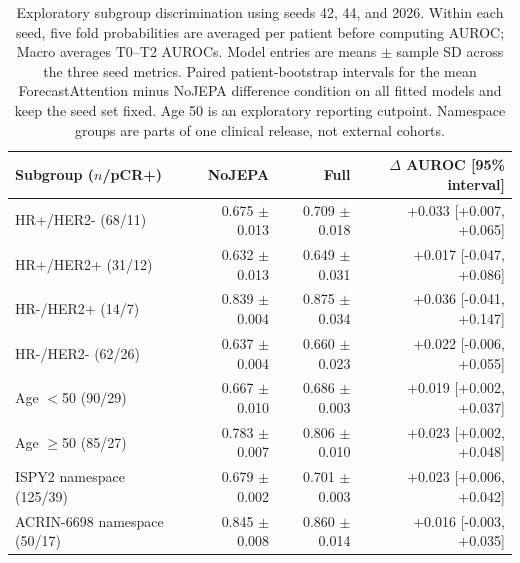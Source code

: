 \begin{table}[t]
\centering
\small
\caption{Exploratory subgroup discrimination using seeds 42, 44, and 2026. Within each seed, five fold probabilities are averaged per patient before computing AUROC; Macro averages T0--T2 AUROCs. Model entries are means $\pm$ sample SD across the three seed metrics. Paired patient-bootstrap intervals for the mean ForecastAttention minus NoJEPA difference condition on all fitted models and keep the seed set fixed. Age 50 is an exploratory reporting cutpoint. Namespace groups are parts of one clinical release, not external cohorts.}
\label{tab:subgroups}
\begin{tabular}{lrrr}
\toprule
Subgroup ($n$/pCR+) & NoJEPA & Full & $\Delta$ AUROC [95\% interval] \\
\midrule
HR+/HER2- (68/11) & 0.675 $\pm$ 0.013 & 0.709 $\pm$ 0.018 & +0.033 [+0.007, +0.065] \\
HR+/HER2+ (31/12) & 0.632 $\pm$ 0.013 & 0.649 $\pm$ 0.031 & +0.017 [-0.047, +0.086] \\
HR-/HER2+ (14/7) & 0.839 $\pm$ 0.004 & 0.875 $\pm$ 0.034 & +0.036 [-0.041, +0.147] \\
HR-/HER2- (62/26) & 0.637 $\pm$ 0.004 & 0.660 $\pm$ 0.023 & +0.022 [-0.006, +0.055] \\
Age $<$50 (90/29) & 0.667 $\pm$ 0.010 & 0.686 $\pm$ 0.003 & +0.019 [+0.002, +0.037] \\
Age $\geq$50 (85/27) & 0.783 $\pm$ 0.007 & 0.806 $\pm$ 0.010 & +0.023 [+0.002, +0.048] \\
ISPY2 namespace (125/39) & 0.679 $\pm$ 0.002 & 0.701 $\pm$ 0.003 & +0.023 [+0.006, +0.042] \\
ACRIN-6698 namespace (50/17) & 0.845 $\pm$ 0.008 & 0.860 $\pm$ 0.014 & +0.016 [-0.003, +0.035] \\
\bottomrule
\end{tabular}
\end{table}
